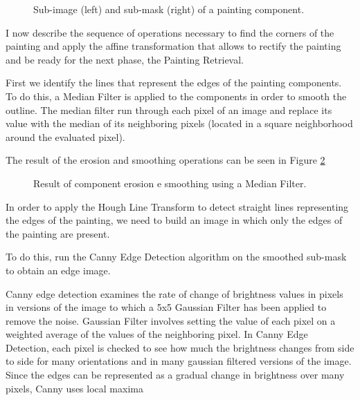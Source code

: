 \documentclass[10pt,twocolumn,letterpaper]{article}
\begin{document}
\begin{figure}[t]
   \begin{center}
   \fbox{\rule{0pt}{2in} \rule{0.9\linewidth}{0pt}}
   \end{center}
      \caption{Sub-image (left) and sub-mask (right) of a painting component.}
   \label{fig:subImageMask}
\end{figure}

I now describe the sequence of operations necessary to find the corners of the painting and apply the affine transformation that allows to rectify the painting and be ready for the next phase, the Painting Retrieval.

First we identify the lines that represent the edges of the painting components. To do this, a Median Filter is applied to the components in order to smooth the outline. The median filter run through each pixel of an image and replace its value with the median of its neighboring pixels (located in a square neighborhood around the evaluated pixel). 

The result of the erosion and smoothing operations can be seen in Figure \ref{fig:erosionAndMedianFilter}

\begin{figure}[t]
   \begin{center}
   \fbox{\rule{0pt}{2in} \rule{0.9\linewidth}{0pt}}
   \end{center}
      \caption{Result of component erosion e smoothing using a Median Filter.}
   \label{fig:erosionAndMedianFilter}
\end{figure}

In order to apply the Hough Line Transform to detect straight lines representing the edges of the painting, we need to build an image in which only the edges of the painting are present.

To do this, run the Canny Edge Detection \cite{canny1986computational} algorithm on the smoothed sub-mask to obtain an edge image. 

Canny edge detection examines the rate of change of brightness values in pixels in versions of the image to which a 5x5 Gaussian Filter has been applied to remove the noise. Gaussian Filter involves setting the value of each pixel on a weighted average of the values of the neighboring pixel. In Canny Edge Detection, each pixel is checked to see how much the brightness changes from side to side for many orientations and in many gaussian filtered versions of the image. Since the edges can be represented as a gradual change in brightness over many pixels, Canny uses local maxima
\end{document}

